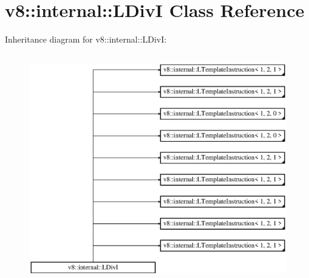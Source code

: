 \hypertarget{classv8_1_1internal_1_1_l_div_i}{}\section{v8\+:\+:internal\+:\+:L\+DivI Class Reference}
\label{classv8_1_1internal_1_1_l_div_i}
Inheritance diagram for v8\+:\+:internal\+:\+:L\+DivI\+:\begin{figure}[H]
\begin{center}
\leavevmode
\includegraphics[height=10.000000cm]{classv8_1_1internal_1_1_l_div_i}
\end{center}
\end{figure}
